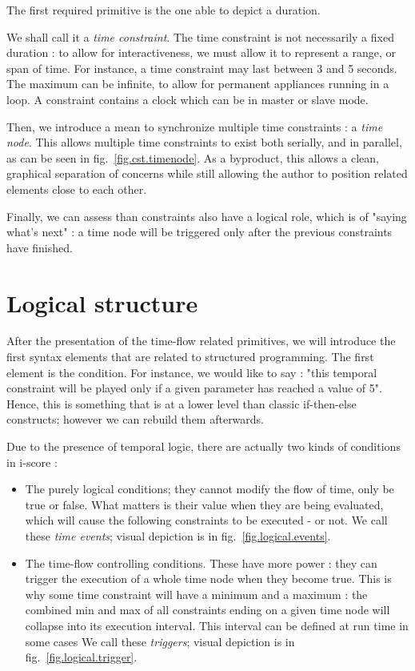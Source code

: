 \documentclass{sigchi}
\begin{document}
The first required primitive is the one able to depict a duration.

We shall call it a \textit{time constraint}.
The time constraint is not necessarily a fixed duration : to allow for interactiveness, 
we must allow it to represent a range, or span of time. For instance, a time constraint may last between 3 and 5 seconds. The maximum can be infinite, to allow for permanent appliances running in a loop. A constraint contains a clock which can be in master or slave mode.

Then, we introduce a mean to synchronize multiple time constraints : a \textit{time node}. 
This allows multiple time constraints to exist both serially, and in parallel, as can be seen in fig.~\ref{fig.cst.timenode}. 
As a byproduct, this allows a clean, graphical separation of concerns while still allowing the author to position related elements close to each other. %

Finally, we can assess than constraints also have a logical role, which is of "saying what's next" : a time node will be triggered only after the previous constraints have finished.




\section{Logical structure}\label{sec.structured}
After the presentation of the time-flow related primitives, we will introduce the first syntax elements that are related to structured programming.
The first element is the condition. For instance, we would like to say : "this temporal constraint will be played only if a given parameter has reached a value of 5".
Hence, this is something that is at a lower level than classic if-then-else constructs; however we can rebuild them afterwards.

Due to the presence of temporal logic, there are actually two kinds of conditions in i-score : 
\begin{itemize}
	\item The purely logical conditions; they cannot modify the flow of time, only be true or false. What matters is their value when they are being evaluated, which will cause the following constraints to be executed - or not. We call these \textit{time events}; visual depiction is in fig.~\ref{fig.logical.events}.
	\item The time-flow controlling conditions. These have more power : they can trigger the execution of a whole time node when they become true. This is why some time constraint will have a minimum and a maximum : the combined min and max of all constraints ending on a given time node will collapse into its execution interval. This interval can be defined at run time in some cases %
	We call these \textit{triggers}; visual depiction is in fig.~\ref{fig.logical.trigger}.
\end{itemize}
\end{document}
